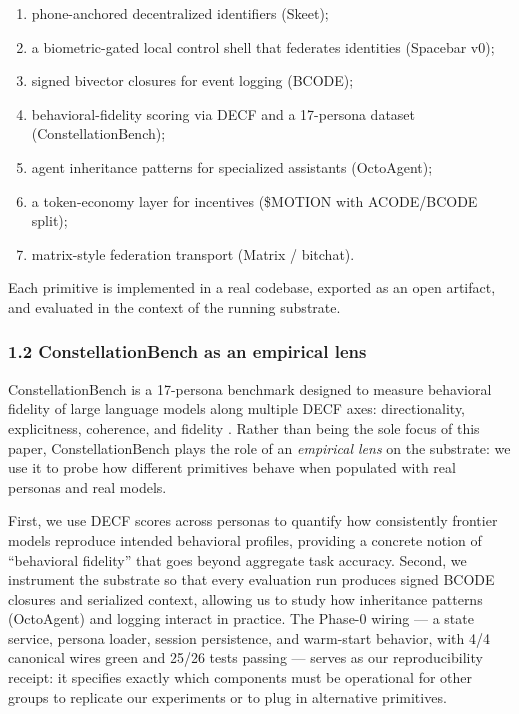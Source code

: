 \begin{enumerate}
\def\labelenumi{\arabic{enumi}.}
\tightlist
\item
  phone-anchored decentralized identifiers (Skeet);
\item
  a biometric-gated local control shell that federates identities
  (Spacebar v0);
\item
  signed bivector closures for event logging (BCODE);
\item
  behavioral-fidelity scoring via DECF and a 17-persona dataset
  (ConstellationBench);
\item
  agent inheritance patterns for specialized assistants (OctoAgent);
\item
  a token-economy layer for incentives (\$MOTION with ACODE/BCODE
  split);
\item
  matrix-style federation transport (Matrix / bitchat).
\end{enumerate}

Each primitive is implemented in a real codebase, exported as an open
artifact, and evaluated in the context of the running substrate.

\subsubsection{1.2 ConstellationBench as an empirical
lens}\label{constellationbench-as-an-empirical-lens}

ConstellationBench is a 17-persona benchmark designed to measure
behavioral fidelity of large language models along multiple DECF axes:
directionality, explicitness, coherence, and fidelity
\citep{constellationbench2026}. Rather than being the sole focus of this
paper, ConstellationBench plays the role of an \emph{empirical lens} on
the substrate: we use it to probe how different primitives behave when
populated with real personas and real models.

First, we use DECF scores across personas to quantify how consistently
frontier models reproduce intended behavioral profiles, providing a
concrete notion of ``behavioral fidelity'' that goes beyond aggregate
task accuracy. Second, we instrument the substrate so that every
evaluation run produces signed BCODE closures and serialized context,
allowing us to study how inheritance patterns (OctoAgent) and logging
interact in practice. The Phase-0 wiring --- a state service, persona
loader, session persistence, and warm-start behavior, with 4/4 canonical
wires green and 25/26 tests passing --- serves as our reproducibility
receipt: it specifies exactly which components must be operational for
other groups to replicate our experiments or to plug in alternative
primitives.

